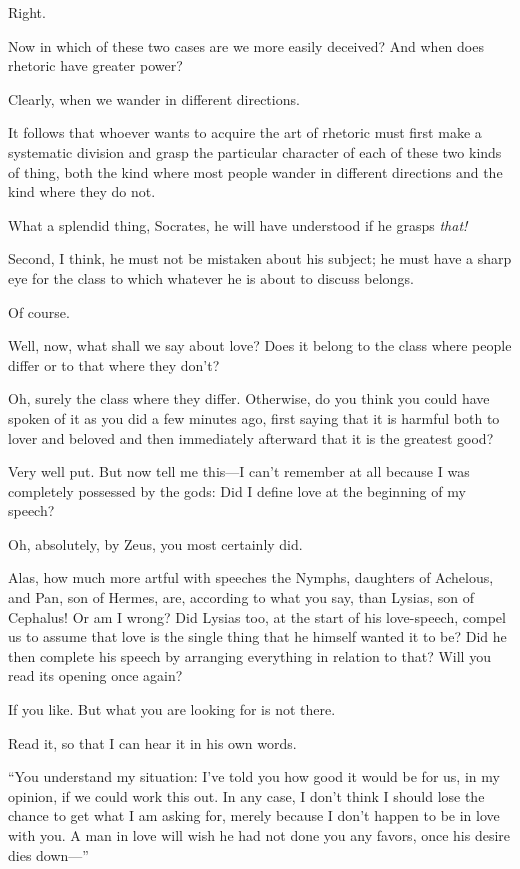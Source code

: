 \sayphaedrus Right.

\saysocrates Now in which of these two cases are we more easily deceived?
And when does rhetoric have greater power?

\sayphaedrus Clearly, when we wander in different directions.

\saysocrates It follows that whoever wants to acquire the art of rhetoric
must first make a systematic division and grasp the particular character
of each of these two kinds of thing, both the kind where most people
wander in different directions and the kind where they do not.

\sayphaedrus What a splendid thing, Socrates, he will have
understood if he grasps {\em that!}

\saysocrates Second, I think, he must not be mistaken about his subject; he
must have a sharp eye for the class to which whatever he is about to
discuss belongs.

\sayphaedrus Of course.

\saysocrates Well, now, what shall we say about love? Does it belong to the
class where people differ or to that where they don’t?

\sayphaedrus Oh, surely the class where they differ. Otherwise, do you
think you could have spoken of it as you did a few minutes ago, first
saying that it is harmful both to lover and beloved and then immediately
afterward that it is the greatest good?

\saysocrates Very well put. But now tell me this---I can’t remember
at all because I was completely possessed by the gods: Did I define love
at the beginning of my speech?

\sayphaedrus Oh, absolutely, by Zeus, you most certainly did.

\saysocrates Alas, how much more artful with speeches the Nymphs, daughters
of Achelous, and Pan, son of Hermes, are, according to what you say,
than Lysias, son of Cephalus! Or am I wrong? Did Lysias too, at 
the start of his love-speech, compel us to assume that love is the
single thing that he himself wanted it to be? Did he then complete his
speech by arranging everything in relation to that? Will you read its
opening once again?

\sayphaedrus If you like. But what you are looking for is not there.

\saysocrates Read it, so that I can hear it in his own words.

\sayphaedrus “You understand my situation: I’ve told you how good it would
be for us, in my opinion, if we could work this out. In any case, I
don’t think I should lose the chance to get what I am asking for, merely
because I don’t happen to be in love with you. A man in
love will wish he had not done you any favors, once his desire dies
down---”


